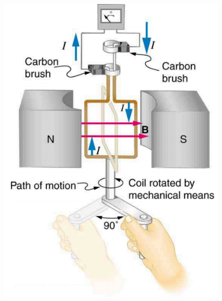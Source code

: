 \documentclass{beamer}
\begin{document}
\begin{frame}
\begin{figure}
    \centering
    \includegraphics[width=1\linewidth]{phys12-circuits-rc-circuit-diagram.png}
\end{figure}
\end{frame}
\end{document}
